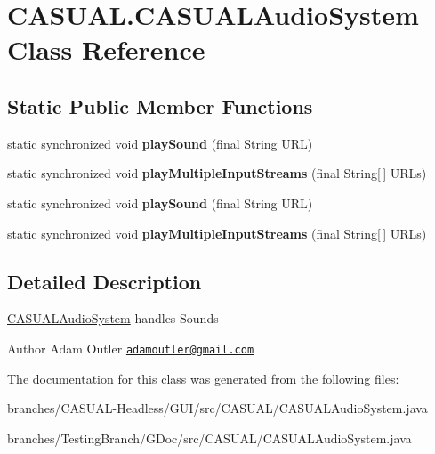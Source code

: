 \hypertarget{classCASUAL_1_1CASUALAudioSystem}{\section{C\-A\-S\-U\-A\-L.\-C\-A\-S\-U\-A\-L\-Audio\-System Class Reference}
\label{classCASUAL_1_1CASUALAudioSystem}
}
\subsection*{Static Public Member Functions}
\begin{DoxyCompactItemize}
\item 
\hypertarget{classCASUAL_1_1CASUALAudioSystem_af178e07e8a55d9d7d04288394649a824}{static synchronized void {\bfseries play\-Sound} (final String U\-R\-L)}\label{classCASUAL_1_1CASUALAudioSystem_af178e07e8a55d9d7d04288394649a824}

\item 
\hypertarget{classCASUAL_1_1CASUALAudioSystem_ac8c3c01ac6a5e1a3eb99e853734d0a9d}{static synchronized void {\bfseries play\-Multiple\-Input\-Streams} (final String\mbox{[}$\,$\mbox{]} U\-R\-Ls)}\label{classCASUAL_1_1CASUALAudioSystem_ac8c3c01ac6a5e1a3eb99e853734d0a9d}

\item 
\hypertarget{classCASUAL_1_1CASUALAudioSystem_af178e07e8a55d9d7d04288394649a824}{static synchronized void {\bfseries play\-Sound} (final String U\-R\-L)}\label{classCASUAL_1_1CASUALAudioSystem_af178e07e8a55d9d7d04288394649a824}

\item 
\hypertarget{classCASUAL_1_1CASUALAudioSystem_ac8c3c01ac6a5e1a3eb99e853734d0a9d}{static synchronized void {\bfseries play\-Multiple\-Input\-Streams} (final String\mbox{[}$\,$\mbox{]} U\-R\-Ls)}\label{classCASUAL_1_1CASUALAudioSystem_ac8c3c01ac6a5e1a3eb99e853734d0a9d}

\end{DoxyCompactItemize}


\subsection{Detailed Description}
\hyperlink{classCASUAL_1_1CASUALAudioSystem}{C\-A\-S\-U\-A\-L\-Audio\-System} handles Sounds

\begin{DoxyAuthor}{Author}
Adam Outler \href{mailto:adamoutler@gmail.com}{\tt adamoutler@gmail.\-com} 
\end{DoxyAuthor}


The documentation for this class was generated from the following files\-:\begin{DoxyCompactItemize}
\item 
branches/\-C\-A\-S\-U\-A\-L-\/\-Headless/\-G\-U\-I/src/\-C\-A\-S\-U\-A\-L/C\-A\-S\-U\-A\-L\-Audio\-System.\-java\item 
branches/\-Testing\-Branch/\-G\-Doc/src/\-C\-A\-S\-U\-A\-L/C\-A\-S\-U\-A\-L\-Audio\-System.\-java\end{DoxyCompactItemize}
